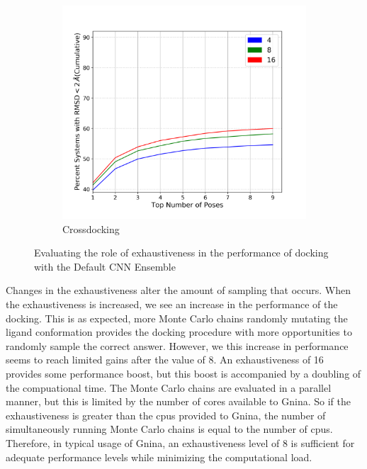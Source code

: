 \documentclass[journal=jcisd8,manuscript=article]{achemso}
\begin{document}
\begin{figure}
\begin{subfigure}[b]{0.48\textwidth}
		\includegraphics[width=\textwidth]{figures/crossdocking/sweep_exhaustiveness_line.png}
		\caption{Crossdocking}
		\label{fig:exhaustiveness cd}
        \end{subfigure}    
	\caption{Evaluating the role of exhaustiveness in the performance of docking with the Default CNN Ensemble}
	\label{fig:exhaustiveness}
\end{figure}    

Changes in the exhaustiveness alter the amount of sampling that occurs. When the exhaustiveness is increased, we see an increase in the performance of the docking. This is as expected, more Monte Carlo chains randomly mutating the ligand conformation provides the docking procedure with more opportunities to randomly sample the correct answer. However, we this increase in performance seems to reach limited gains after the value of 8. An exhaustiveness of 16 provides some performance boost, but this boost is accompanied by a doubling of the compuational time. The Monte Carlo chains are evaluated in a parallel manner, but this is limited by the number of cores available to Gnina. So if the exhaustiveness is greater than the cpus provided to Gnina, the number of simultaneously running Monte Carlo chains is equal to the number of cpus. Therefore, in typical usage of Gnina, an exhaustiveness level of 8 is sufficient for adequate performance levels while minimizing the computational load.
\end{document}
